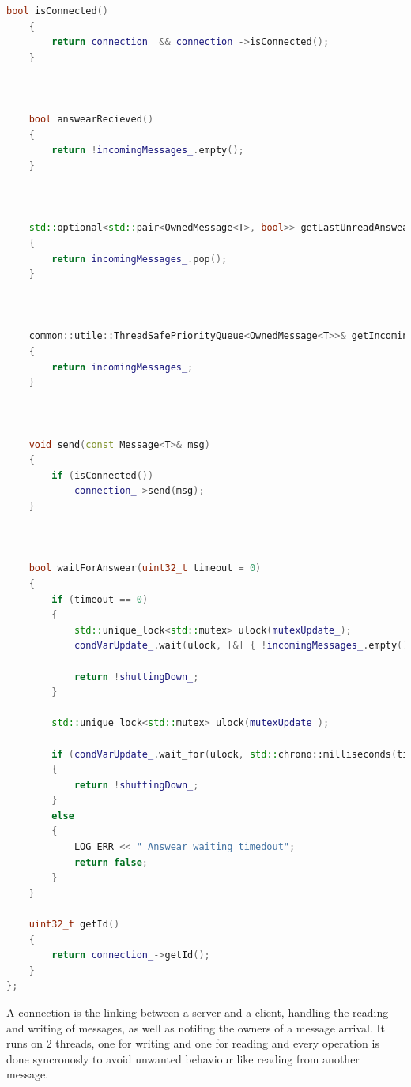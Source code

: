 \documentclass[17pt]{article}
\begin{document}
\begin{lstlisting}[language = C++]
    bool isConnected()
    {
        return connection_ && connection_->isConnected();
    }



    bool answearRecieved()
    {
        return !incomingMessages_.empty();
    }



    std::optional<std::pair<OwnedMessage<T>, bool>> getLastUnreadAnswear()
    {
        return incomingMessages_.pop();
    }



    common::utile::ThreadSafePriorityQueue<OwnedMessage<T>>& getIncomingMessages()
    {
        return incomingMessages_;
    }



    void send(const Message<T>& msg)
    {
        if (isConnected())
            connection_->send(msg);
    }



    bool waitForAnswear(uint32_t timeout = 0)
    {
        if (timeout == 0)
        {
            std::unique_lock<std::mutex> ulock(mutexUpdate_);
            condVarUpdate_.wait(ulock, [&] { !incomingMessages_.empty() || shuttingDown_; });

            return !shuttingDown_;
        }

        std::unique_lock<std::mutex> ulock(mutexUpdate_);

        if (condVarUpdate_.wait_for(ulock, std::chrono::milliseconds(timeout * 100), [&] { !incomingMessages_.empty() || shuttingDown_; }))
        {
            return !shuttingDown_;
        }
        else
        {
            LOG_ERR << " Answear waiting timedout";
            return false;
        }
    }

    uint32_t getId()
    {
        return connection_->getId();
    }
};
\end{lstlisting}
\pagebreak

\indent \indent
A connection is the linking between a server and a client, handling the reading and 
writing of messages, as well as notifing the owners of a message arrival. It runs 
on 2 threads, one for writing and one for reading and every operation is done 
syncronosly to avoid unwanted behaviour like reading from another message.\\
\end{document}
